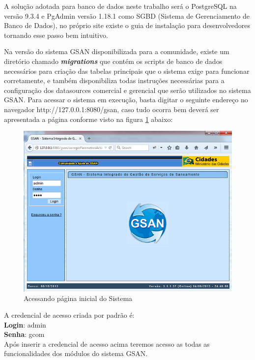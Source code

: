 A solução adotada para banco de dados neste trabalho será o PostgreSQL na versão 9.3.4 e PgAdmin versão 1.18.1 como SGBD (Sistema de Gerenciamento de Banco de Dados), no próprio site existe o guia de instalação para desenvolvedores tornando esse passo bem intuitivo.

Na versão do sistema GSAN disponibilizada para a comunidade, existe um diretório chamado \textbf{\textit{migrations}} que contém os scripts de banco de dados necessários para criação das tabelas principais que o sistema exige para funcionar corretamente, e também disponibiliza todas instruções necessárias para a configuração dos datasources comercial e gerencial que serão utilizados no sistema GSAN.
Para acessar o sistema em execução, basta digitar o seguinte endereço no navegador http://127.0.0.1:8080/gsan, caso tudo ocorra bem deverá ser apresentada a página conforme visto na figura \ref{figura:acessoPaginaInicial} abaixo:

\begin{figure}[!htb]
	\centering
	\caption{Acessando página inicial do Sistema}
	\label{figura:acessoPaginaInicial}	
	\includegraphics{figuras/gsan_online.png}	
\end{figure}


A credencial de acesso criada por padrão é: \\
\textbf{Login}: admin \\
\textbf{Senha}: gcom \\
Após inserir a credencial de acesso acima teremos acesso as todas as funcionalidades dos módulos do sistema GSAN.

